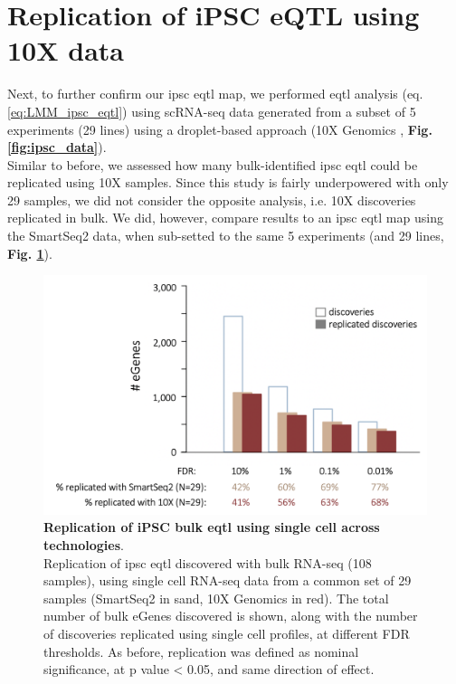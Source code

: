 
\section{Replication of iPSC eQTL using 10X data}

Next, to further confirm our \gls{ipsc} \gls{eqtl} map, we performed \gls{eqtl} analysis (eq. \eqref{eq:LMM_ipsc_eqtl}) using scRNA-seq data generated from a subset of 5 experiments (29 lines) using a droplet-based approach (10X Genomics \cite{zheng2017massively}, \textbf{Fig. \ref{fig:ipsc_data}}).\\

Similar to before, we assessed how many bulk-identified \gls{ipsc} \gls{eqtl} could be replicated using 10X samples.
Since this study is fairly underpowered with only 29 samples, we did not consider the opposite analysis, i.e. 10X discoveries replicated in bulk.
We did, however, compare results to an \gls{ipsc} \gls{eqtl} map using the SmartSeq2 data, when sub-setted to the same 5 experiments (and 29 lines, \textbf{Fig. \ref{fig:sc_bulk_10x_egenes}}). 

\begin{figure}[h]
\includegraphics[width=14.5cm]{Chapter3/Fig/sc_vs_bulk_vs_10x.png}
\caption[iPSC bulk eQTL replication]{\textbf{Replication of iPSC bulk \gls{eqtl} using single cell across technologies}.\\
Replication of \gls{ipsc} \gls{eqtl} discovered with bulk RNA-seq (108 samples), using single cell RNA-seq data from a common set of 29 samples (SmartSeq2 in sand, 10X Genomics in red). 
The total number of bulk eGenes discovered is shown, along with the number of discoveries replicated using single cell profiles, at different FDR thresholds. 
As before, replication was defined as nominal significance, at p value < 0.05, and same direction of effect.}
\label{fig:sc_bulk_10x_egenes}
\end{figure}

